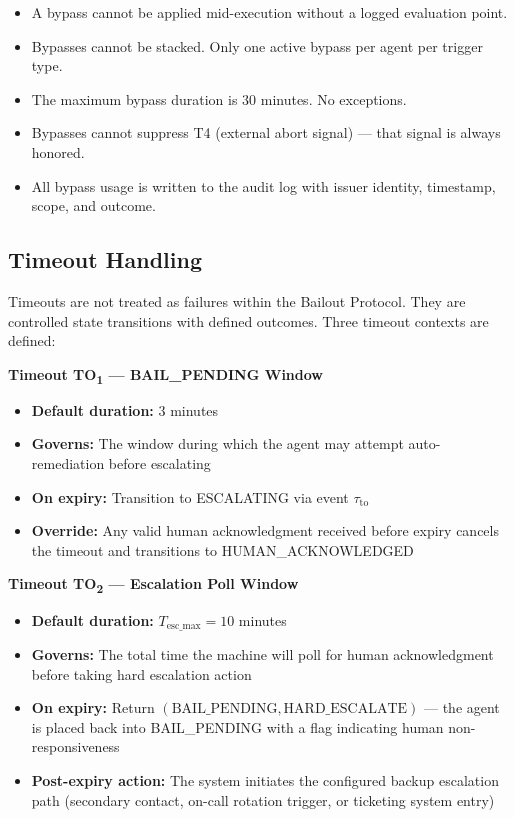 \begin{itemize}
  \item A bypass cannot be applied mid-execution without a logged evaluation point.
  \item Bypasses cannot be stacked. Only one active bypass per agent per trigger type.
  \item The maximum bypass duration is $30$ minutes. No exceptions.
  \item Bypasses cannot suppress T4 (external abort signal) — that signal is always honored.
  \item All bypass usage is written to the audit log with issuer identity, timestamp, scope, and outcome.
\end{itemize}


\subsection{Timeout Handling}

Timeouts are not treated as failures within the Bailout Protocol. They are controlled state transitions with defined outcomes. Three timeout contexts are defined:

\bigskip
\noindent\textbf{Timeout TO\textsubscript{1} — BAIL\_PENDING Window}

\begin{itemize}
  \item \textbf{Default duration:} $3$ minutes
  \item \textbf{Governs:} The window during which the agent may attempt auto-remediation before escalating
  \item \textbf{On expiry:} Transition to ESCALATING via event $\tau_{\text{to}}$
  \item \textbf{Override:} Any valid human acknowledgment received before expiry cancels the timeout and transitions to HUMAN\_ACKNOWLEDGED
\end{itemize}

\bigskip
\noindent\textbf{Timeout TO\textsubscript{2} — Escalation Poll Window}

\begin{itemize}
  \item \textbf{Default duration:} $T_{\text{esc\_max}} = 10$ minutes
  \item \textbf{Governs:} The total time the machine will poll for human acknowledgment before taking hard escalation action
  \item \textbf{On expiry:} Return $(\text{BAIL\_PENDING}, \text{HARD\_ESCALATE})$ — the agent is placed back into BAIL\_PENDING with a flag indicating human non-responsiveness
  \item \textbf{Post-expiry action:} The system initiates the configured backup escalation path (secondary contact, on-call rotation trigger, or ticketing system entry)
\end{itemize}

